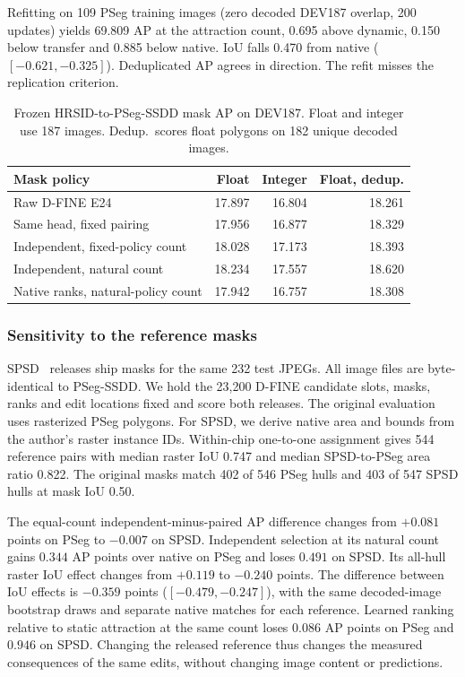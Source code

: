 \documentclass[journal]{IEEEtran}
\begin{document}
Refitting on 109 PSeg training images (zero decoded DEV187 overlap, 200 updates) yields 69.809 AP at the attraction count, 0.695 above dynamic, 0.150 below transfer and 0.885 below native. IoU falls 0.470 from native (\([-0.621,-0.325]\)). Deduplicated AP agrees in direction. The refit misses the replication criterion.

\begin{table}[t]
\centering
\caption{Frozen HRSID-to-PSeg-SSDD mask AP on DEV187. Float and integer use 187 images. Dedup.\ scores float polygons on 182 unique decoded images.}
\label{tab:ssdd}
\footnotesize
\begin{tabular}{@{}lrrr@{}}
\toprule
Mask policy & Float & Integer & Float, dedup. \\
\midrule
Raw D-FINE E24 & 17.897 & 16.804 & 18.261 \\
Same head, fixed pairing & 17.956 & 16.877 & 18.329 \\
Independent, fixed-policy count & 18.028 & 17.173 & 18.393 \\
\midrule
Independent, natural count & 18.234 & 17.557 & 18.620 \\
Native ranks, natural-policy count & 17.942 & 16.757 & 18.308 \\
\bottomrule
\end{tabular}
\end{table}

\subsubsection{Sensitivity to the reference masks}
SPSD~\cite{slgsea} releases ship masks for the same 232 test JPEGs. All image files are byte-identical to PSeg-SSDD. We hold the 23,200 D-FINE candidate slots, masks, ranks and edit locations fixed and score both releases. The original evaluation uses rasterized PSeg polygons. For SPSD, we derive native area and bounds from the author's raster instance IDs. Within-chip one-to-one assignment gives 544 reference pairs with median raster IoU 0.747 and median SPSD-to-PSeg area ratio 0.822. The original masks match 402 of 546 PSeg hulls and 403 of 547 SPSD hulls at mask IoU 0.50.

The equal-count independent-minus-paired AP difference changes from \(+0.081\) points on PSeg to \(-0.007\) on SPSD. Independent selection at its natural count gains \(0.344\) AP points over native on PSeg and loses \(0.491\) on SPSD. Its all-hull raster IoU effect changes from \(+0.119\) to \(-0.240\) points. The difference between IoU effects is \(-0.359\) points (\([-0.479,-0.247]\)), with the same decoded-image bootstrap draws and separate native matches for each reference. Learned ranking relative to static attraction at the same count loses \(0.086\) AP points on PSeg and \(0.946\) on SPSD. Changing the released reference thus changes the measured consequences of the same edits, without changing image content or predictions.
\end{document}
